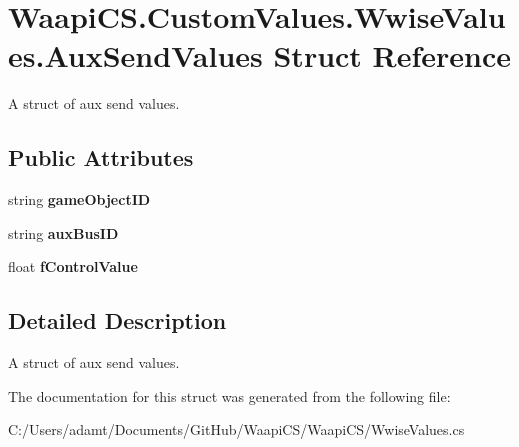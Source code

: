 \hypertarget{struct_waapi_c_s_1_1_custom_values_1_1_wwise_values_1_1_aux_send_values}{}\section{Waapi\+C\+S.\+Custom\+Values.\+Wwise\+Values.\+Aux\+Send\+Values Struct Reference}
\label{struct_waapi_c_s_1_1_custom_values_1_1_wwise_values_1_1_aux_send_values}


A struct of aux send values.  


\subsection*{Public Attributes}
\begin{DoxyCompactItemize}
\item 
\mbox{\label{struct_waapi_c_s_1_1_custom_values_1_1_wwise_values_1_1_aux_send_values_a066d100f7f5a8fc4dde9760e06196b08}} 
string {\bfseries game\+Object\+ID}
\item 
\mbox{\label{struct_waapi_c_s_1_1_custom_values_1_1_wwise_values_1_1_aux_send_values_ad123dd13522c6b40b3a7b0ca315bb0f0}} 
string {\bfseries aux\+Bus\+ID}
\item 
\mbox{\label{struct_waapi_c_s_1_1_custom_values_1_1_wwise_values_1_1_aux_send_values_a33c90ffdeb5734e9440f18bdb52df8c0}} 
float {\bfseries f\+Control\+Value}
\end{DoxyCompactItemize}


\subsection{Detailed Description}
A struct of aux send values. 



The documentation for this struct was generated from the following file\+:\begin{DoxyCompactItemize}
\item 
C\+:/\+Users/adamt/\+Documents/\+Git\+Hub/\+Waapi\+C\+S/\+Waapi\+C\+S/Wwise\+Values.\+cs\end{DoxyCompactItemize}

